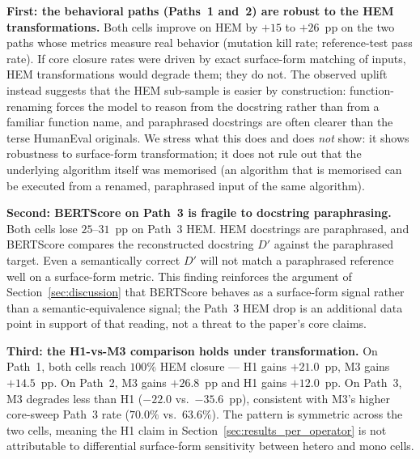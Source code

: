 \textbf{First: the behavioral paths (Paths~1 and~2) are robust to the HEM transformations.} Both cells improve on HEM by $+15$ to $+26$~pp on the two paths whose metrics measure real behavior (mutation kill rate; reference-test pass rate). If core closure rates were driven by exact surface-form matching of inputs, HEM transformations would degrade them; they do not. The observed uplift instead suggests that the HEM sub-sample is easier by construction: function-renaming forces the model to reason from the docstring rather than from a familiar function name, and paraphrased docstrings are often clearer than the terse HumanEval originals. We stress what this does and does \emph{not} show: it shows robustness to surface-form transformation; it does not rule out that the underlying algorithm itself was memorised (an algorithm that is memorised can be executed from a renamed, paraphrased input of the same algorithm).

\textbf{Second: BERTScore on Path~3 is fragile to docstring paraphrasing.} Both cells lose $25$--$31$~pp on Path~3 HEM. HEM docstrings are paraphrased, and BERTScore compares the reconstructed docstring $D'$ against the paraphrased target. Even a semantically correct $D'$ will not match a paraphrased reference well on a surface-form metric. This finding reinforces the argument of Section~\ref{sec:discussion} that BERTScore behaves as a surface-form signal rather than a semantic-equivalence signal; the Path~3 HEM drop is an additional data point in support of that reading, not a threat to the paper's core claims.

\textbf{Third: the H1-vs-M3 comparison holds under transformation.} On Path~1, both cells reach $100\%$ HEM closure --- H1 gains $+21.0$~pp, M3 gains $+14.5$~pp. On Path~2, M3 gains $+26.8$~pp and H1 gains $+12.0$~pp. On Path~3, M3 degrades less than H1 ($-22.0$ vs.\ $-35.6$~pp), consistent with M3's higher core-sweep Path~3 rate ($70.0\%$ vs.\ $63.6\%$). The pattern is symmetric across the two cells, meaning the H1 claim in Section~\ref{sec:results_per_operator} is not attributable to differential surface-form sensitivity between hetero and mono cells.

